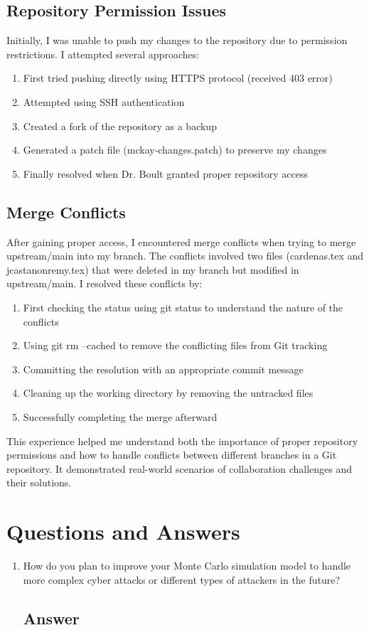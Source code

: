 \subsection{Repository Permission Issues}
Initially, I was unable to push my changes to the repository due to permission restrictions. I attempted several approaches:
\begin{enumerate}
    \item First tried pushing directly using HTTPS protocol (received 403 error)
    \item Attempted using SSH authentication
    \item Created a fork of the repository as a backup
    \item Generated a patch file (mckay-changes.patch) to preserve my changes
    \item Finally resolved when Dr. Boult granted proper repository access
\end{enumerate}

\subsection{Merge Conflicts}
After gaining proper access, I encountered merge conflicts when trying to merge upstream/main into my branch. 
The conflicts involved two files (cardenas.tex and jcastanonremy.tex) that were deleted in my branch 
but modified in upstream/main. I resolved these conflicts by:
\begin{enumerate}
    \item First checking the status using git status to understand the nature of the conflicts
    \item Using git rm --cached to remove the conflicting files from Git tracking
    \item Committing the resolution with an appropriate commit message
    \item Cleaning up the working directory by removing the untracked files
    \item Successfully completing the merge afterward
\end{enumerate}

This experience helped me understand both the importance of proper repository permissions and 
how to handle conflicts between different branches in a Git repository. It demonstrated 
real-world scenarios of collaboration challenges and their solutions.

\section{Questions and Answers}
\begin{enumerate}
    \item How do you plan to improve your Monte Carlo simulation model to handle more complex cyber attacks or different types of attackers in the future?
    
    \subsection*{Answer}

\end{enumerate}


% 